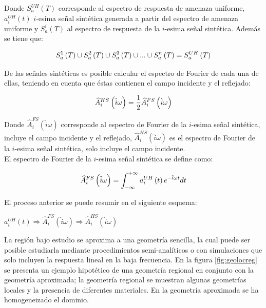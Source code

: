 \documentclass[spanish,letterpaper,12pt,twoside,openany]{article}
\begin{document}
Donde $S_{a}^{UH} \left( T \right)$ corresponde al espectro de respuesta de amenaza uniforme, $a_{i}^{UH}\left( t \right)$ $i$-esima señal sintética generada a partir del espectro de amenaza uniforme y $S_{a}^{i} \left( T \right)$ al espectro de respuesta de la $i$-esima señal sintética. Además se tiene que:
%
\begin{large}
	\begin{align}
		S_{a}^{1} \left( T \right) \cup S_{a}^{2} \left( T \right) \cup S_{a}^{3} \left( T \right) \cup ... \cup S_{a}^{n} \left( T \right) = S_{a}^{UH} \left( T \right)
		\vspace{-1 cm}
	\end{align}	
\end{large}
%
%
De las señales sintéticas es posible calcular el espectro de Fourier de cada una de ellas, teniendo en cuenta que éstas contienen el campo incidente y el reflejado:
%
\begin{large}
	\begin{align}\label{eq:espfouhs}
		\widehat{A}^{HS}_{i} \left( \hat{i} \omega \right) = \dfrac{1}{2} \widehat{A}^{FS}_{i} \left( \hat{i} \omega \right)
	\vspace{-1 cm}
	\end{align}
\end{large}
%
Donde $\widehat{A}^{FS}_{i} \left( \hat{i} \omega \right)$ corresponde al espectro de Fourier de la $i$-esima señal sintética, incluye el campo incidente y el reflejado, $\widehat{A}^{HS}_{i} \left( \hat{i} \omega \right)$ es el espectro de Fourier de la $i$-esima señal sintética, solo incluye el campo incidente.\\
%
El espectro de Fourier de la $i$-esima señal sintética se define como:
%
\begin{large}
	\begin{align}\label{eq:fourdirec}
		\widehat{A}^{FS}_{i} \left( \hat{i} \omega \right) = \int_{-\infty}^{+\infty} a_{i}^{UH} \left( t \right) e^{-\hat{i} \omega t} dt 
	\vspace{-1 cm}
	\end{align}
\end{large}
%
El proceso anterior se puede resumir en el siguiente esquema:

\begin{large}
	$a_{i}^{UH}\left( t \right) \Rightarrow \widehat{A}^{FS}_{i} \left( \hat{i} \omega \right) \Rightarrow \widehat{A}^{HS}_{i} \left( \hat{i} \omega \right)$
\end{large} 

La región bajo estudio se aproxima a una geometría sencilla, la cual puede ser posible estudiarla mediante procedimientos semi-analíticos o con simulaciones que solo incluyen la respuesta lineal en la baja frecuencia. En la figura \ref{fig:geolocreg} se presenta un ejemplo hipotético de una geometría regional en conjunto con la geometría aproximada; la geometría regional se muestran algunas geometrías locales y la presencia de diferentes materiales. En la geometría aproximada se ha homogeneizado el dominio.
\end{document}
